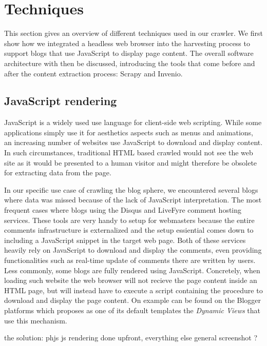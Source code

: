 \section{Techniques}

This section gives an overview of different techniques used in our crawler. We first show how we integrated a headless web browser into the harvesting process to support blogs that use JavaScript to display page content. The overall software architecture with then be discussed, introducing the tools that come before and after the content extraction process: Scrapy and Invenio.

\subsection{JavaScript rendering}
JavaScript is a widely used use language for client-side web scripting. While some applications simply use it for aesthetics aspects such as menus and animations, an increasing number of websites use JavaScript to download and display content. In such circumstances, traditional HTML based crawled would not see the web site as it would be presented to a human visitor and might therefore be obsolete for extracting data from the page.

In our specific use case of crawling the blog sphere, we encountered several blogs where data was missed because of the lack of JavaScript interpretation. The most frequent cases where blogs using the Disqus and LiveFyre comment hosting services. These tools are very handy to setup for webmasters because the entire comments infrastructure is externalized and the setup essiential comes down to including a JavaScript snippet in the target web page. Both of these services heavily rely on JavaScript to download and display the comments, even providing functionalities such as real-time update of comments there are written by users. Less commonly, some blogs are fully rendered using JavaScript. Concretely, when loading such website the web browser will not recieve the page content inside an HTML page, but will instead have to execute a script containing the procedure to download and display the page content. On example can be found on the Blogger platforms which proposes as one of its default templates the \emph{Dynamic Views}  that use this mechanism.

the solution: phjs \cite{readability}
js rendering done upfront, everything else general
screenshot ?

